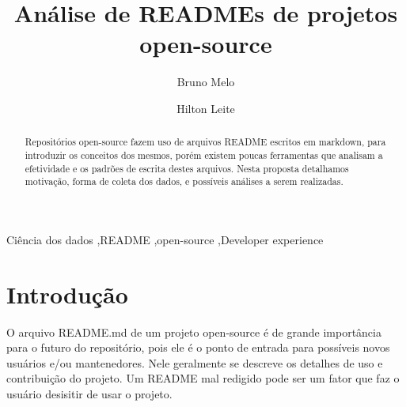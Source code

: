 \documentclass[preprint,12pt,authoryear]{elsarticle}
\begin{document}
\begin{frontmatter}



\title{Análise de READMEs de projetos open-source}


\author{Bruno Melo}

\author{Hilton Leite}


\begin{abstract}
Repositórios open-source fazem uso de arquivos README escritos em markdown, para introduzir os conceitos dos mesmos, porém existem poucas ferramentas que analisam a efetividade e os padrões de escrita destes arquivos. Nesta proposta detalhamos motivação, forma de coleta dos dados, e possíveis análises a serem realizadas.
\end{abstract}

\begin{keyword}
Ciência dos dados \sep README \sep open-source \sep Developer experience


\end{keyword}

\end{frontmatter}


\section{Introdução}
\label{}
O arquivo README.md de um projeto open-source é de grande importância para o futuro do repositório, pois ele é o ponto de entrada para possíveis novos usuários e/ou mantenedores. Nele geralmente se descreve os detalhes de uso e contribuição do projeto. Um README mal redigido pode ser um fator que faz o usuário desisitir de usar o projeto.
\end{document}
